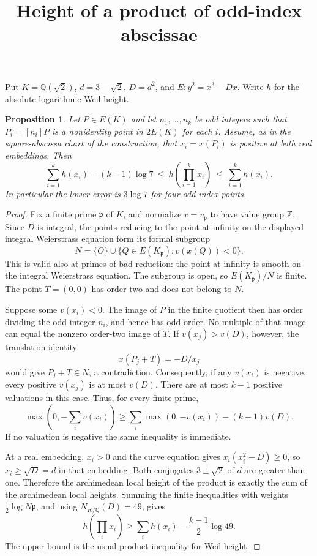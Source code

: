 \documentclass[11pt]{article}
\newtheorem{proposition}{Proposition}
\begin{document}
\title{Height of a product of odd-index abscissae}
\author{}\date{}\maketitle
Put $K=\mathbb Q(\sqrt2)$, $d=3-\sqrt2$, $D=d^2$, and
$E:y^2=x^3-Dx$. Write $h$ for the absolute logarithmic Weil height.
\begin{proposition}
Let $P\in E(K)$ and let $n_1,\ldots,n_k$ be odd integers such that
$P_i=[n_i]P$ is a nonidentity point in $2E(K)$ for each $i$.
Assume, as in the square-abscissa chart of the construction, that
$x_i=x(P_i)$ is positive at both real embeddings. Then
\[
 \sum_{i=1}^k h(x_i)-(k-1)\log7
 \ \leq\ h\left(\prod_{i=1}^k x_i\right)
 \ \leq\ \sum_{i=1}^k h(x_i).
\]
In particular the lower error is $3\log7$ for four odd-index points.
\end{proposition}
\begin{proof}
Fix a finite prime $\mathfrak p$ of $K$, and normalize $v=v_{\mathfrak p}$
to have value group $\mathbb Z$. Since $D$ is integral, the points reducing
to the point at infinity on the displayed integral Weierstrass equation
form its formal subgroup
\[
 N=\{O\}\cup\{Q\in E(K_{\mathfrak p}):v(x(Q))<0\}.
\]
This is valid also at primes of bad reduction: the point at infinity is
smooth on the integral Weierstrass equation. The subgroup is open, so
$E(K_{\mathfrak p})/N$ is finite. The point $T=(0,0)$ has order two and
does not belong to $N$.

Suppose some $v(x_i)<0$. The image of $P$ in the finite quotient then has
order dividing the odd integer $n_i$, and hence has odd order. No multiple
of that image can equal the nonzero order-two image of $T$. If
$v(x_j)>v(D)$, however, the translation identity
\[
                x(P_j+T)=-D/x_j
\]
would give $P_j+T\in N$, a contradiction. Consequently, if any $v(x_i)$
is negative, every positive $v(x_j)$ is at most $v(D)$. There are at most
$k-1$ positive valuations in this case. Thus, for every finite prime,
\[
 \max\left(0,-\sum_i v(x_i)\right)
 \geq \sum_i\max(0,-v(x_i))-(k-1)v(D).
\]
If no valuation is negative the same inequality is immediate.

At a real embedding, $x_i>0$ and the curve equation gives
$x_i(x_i^2-D)\geq0$, so $x_i\geq\sqrt D=d$ in that embedding. Both
conjugates $3\pm\sqrt2$ of $d$ are greater than one. Therefore the
archimedean local height of the product is exactly the sum of the
archimedean local heights. Summing the finite inequalities with weights
$\frac12\log N\mathfrak p$, and using $N_{K/\mathbb Q}(D)=49$, gives
\[
 h\left(\prod_i x_i\right)
 \geq\sum_i h(x_i)-\frac{k-1}{2}\log49.
\]
The upper bound is the usual product inequality for Weil height.
\end{proof}
\end{document}
